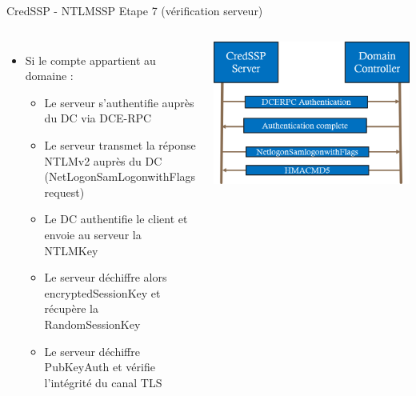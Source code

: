\documentclass{beamer}
\begin{document}
\begin{frame}[fragile]{CredSSP - NTLMSSP Etape 7 (vérification serveur)}
	 \begin{columns}[T]
	 	\begin{itemize}
	 	\item Si le compte appartient au domaine :
	 		\begin{itemize}
	 		\item Le serveur s'authentifie auprès du DC via DCE-RPC
	 		\item Le serveur transmet la réponse NTLMv2 auprès du DC (NetLogonSamLogonwithFlags request)
	 		\item Le DC authentifie le client et envoie au serveur la NTLMKey
	 		\item Le serveur déchiffre alors encryptedSessionKey et récupère la RandomSessionKey
	 		\item Le serveur déchiffre PubKeyAuth et vérifie l'intégrité du canal TLS
	 		\end{itemize}
	 	\end{itemize}
	 \includegraphics[scale=0.3]{graph2.png}
	 \end{columns}
\end{frame}
\end{document}
